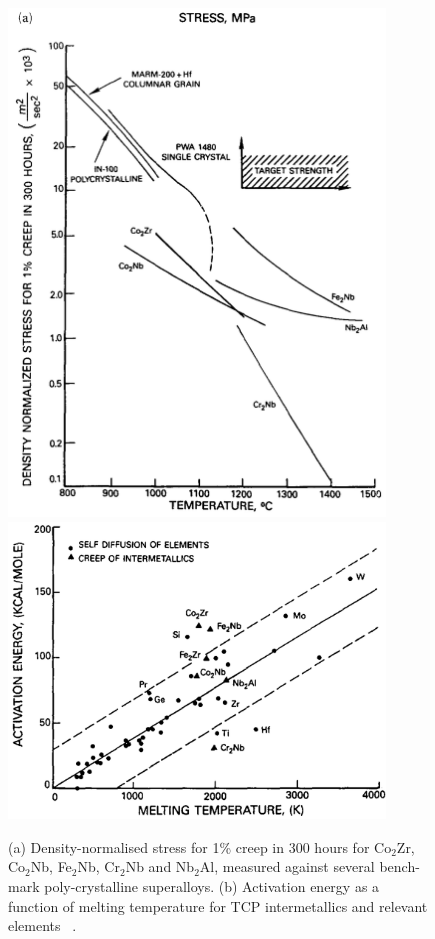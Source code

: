 \begin{figure}[H]
\begin{center}
\includegraphics[width=10cm]{conbzr}
\includegraphics[width=10cm]{q}
\caption{(a) Density-normalised stress for 1\% creep in 300 hours for Co$_2$Zr, Co$_2$Nb, Fe$_2$Nb, Cr$_2$Nb and Nb$_2$Al, measured against several bench-mark poly-crystalline superalloys.  (b) Activation energy as a function of melting temperature for TCP intermetallics and relevant elements ~\cite{anton92}.}
\label{fig:conbzr}
\end{center}
\end{figure}
%



